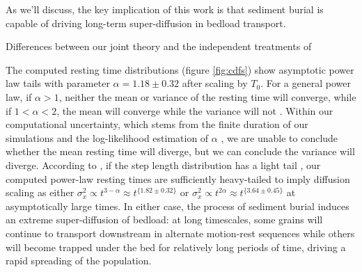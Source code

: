 \documentclass[draft]{agujournal2018}
\begin{document}
As we'll discuss, the key implication of this work is that sediment burial is capable of driving long-term super-diffusion in bedload transport.




Differences between our joint theory and the independent treatments of 

The computed resting time distributions (figure \ref{fig:cdfs}) show asymptotic power law tails with parameter $\alpha = 1.18 \pm 0.32$ after scaling by $T_0$.
For a general power law, if $\alpha>1$, neither the mean or variance of the resting time will converge, while if $1<\alpha <2$, the mean will converge while the variance will not \citep[e.g.][]{Bradley2017}.
Within our computational uncertainty, which stems from the finite duration of our simulations and the log-likelihood estimation of $\alpha$ \citep[e.g.][]{Newman2005}, we are unable to conclude whether the mean resting time will diverge, but we can conclude the variance will diverge.
According to \citet{Weeks1998}, if the step length distribution has a light tail \citep[e.g.][]{Hassan2013}, our computed power-law resting times are sufficiently heavy-tailed to imply diffusion scaling as either $\sigma_x^2 \propto t^{3-\alpha} \approx t^{\{1.82 \pm 0.32 \}}$ or $\sigma_x^2 \propto t^{2\alpha} \approx t^{\{3.64\pm 0.45\}}$ at asymptotically large times.
In either case, the process of sediment burial induces an extreme super-diffusion of bedload: at long timescales, some grains will continue to transport downstream in alternate motion-rest sequences while others will become trapped under the bed for relatively long periods of time, driving a rapid spreading of the population.
\end{document}
